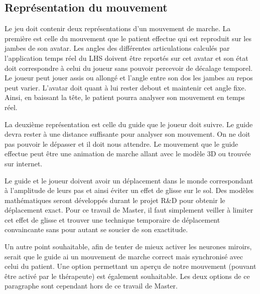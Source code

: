 	\subsection*{Représentation du mouvement}
		Le jeu doit contenir deux représentations d'un mouvement de marche. La première est celle du mouvement que le patient effectue qui est reproduit sur les jambes de son avatar. Les angles des différentes articulations calculés par l'application temps réel du LHS doivent être reportés sur cet avatar et son état doit correspondre à celui du joueur sans pouvoir percevoir de décalage temporel. Le joueur peut jouer assis ou allongé et l'angle entre son dos les jambes au repos peut varier. L'avatar doit quant à lui rester debout et maintenir cet angle fixe. Ainsi, en baissant la tête, le patient pourra analyser son mouvement en temps réel.
		
		La deuxième représentation est celle du guide que le joueur doit suivre. Le guide devra rester à une distance suffisante pour analyser son mouvement. On ne doit pas pouvoir le dépasser et il doit nous attendre. Le mouvement que le guide effectue peut être une animation de marche allant avec le modèle 3D ou trouvée sur internet.
		
		Le guide et le joueur doivent avoir un déplacement dans le monde correspondant à l'amplitude de leurs pas et ainsi éviter un effet de glisse sur le sol. Des modèles mathématiques seront développés durant le projet R\&D pour obtenir le déplacement exact. Pour ce travail de Master, il faut simplement veiller à limiter cet effet de glisse et trouver une technique temporaire de déplacement convaincante sans pour autant se soucier de son exactitude.
		
		Un autre point souhaitable, afin de tenter de mieux activer les neurones miroirs, serait que le guide ai un mouvement de marche correct mais synchronisé avec celui du patient. Une option permettant un aperçu de notre mouvement (pouvant être activé par le thérapeute) est également souhaitable. Les deux options de ce paragraphe sont cependant hors de ce travail de Master.
	
